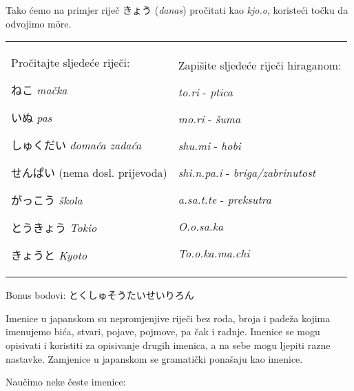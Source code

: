 	\vspace{5pt}
	Tako ćemo na primjer riječ きょう (\textit{danas}) pročitati kao \textit{kjo.o}, koristeći točku da odvojimo m\={o}re.
	
	
	\begin{tabular}{p{200pt} p{200pt}}
		\begin{mondai}{Pročitajte sljedeće riječi:}
			\item ねこ \textit{mačka}
			\item いぬ \textit{pas}
			\item しゅくだい \textit{domaća zadaća}
			\item せんぱい (nema dosl. prijevoda)
			\item がっこう \textit{škola}
			\item とうきょう \textit{Tokio}
			\item きょうと \textit{Kyoto}
		\end{mondai}
		&
		\begin{mondai}{Zapišite sljedeće riječi hiraganom:}
			\item \textit{to.ri} - \textit{ptica}
			\item \textit{mo.ri} - \textit{šuma}
			\item \textit{shu.mi} - \textit{hobi}
			\item \textit{shi.n.pa.i} - \textit{briga/zabrinutost}
			\item \textit{a.sa.t.te} - \textit{preksutra}
			\item \textit{O.o.sa.ka}
			\item \textit{To.o.ka.ma.chi}
		\end{mondai}\\
	\end{tabular}
	
	Bonus bodovi: とくしゅそうたいせいりろん
	
\newpage
{}


	
	
	Imenice u japanskom su nepromjenjive riječi bez roda, broja i padeža kojima imenujemo bića, stvari, pojave, pojmove, pa čak i radnje. Imenice se mogu opisivati i koristiti za opisivanje drugih imenica, a na sebe mogu ljepiti razne nastavke. Zamjenice u japanskom se gramatički ponašaju kao imenice.

Naučimo neke česte imenice:
\vspace{10pt}


